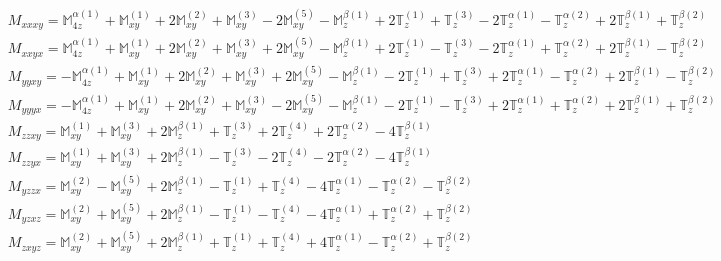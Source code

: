 \documentclass[fleqn,8pt,landscape]{jsarticle}
\begin{document}
\begin{align*}
& M_{xxxy} = \mathbb{M}_{4z}^{\alpha(1)} + \mathbb{M}_{xy}^{(1)} + 2 \mathbb{M}_{xy}^{(2)} + \mathbb{M}_{xy}^{(3)} - 2 \mathbb{M}_{xy}^{(5)} - \mathbb{M}_{z}^{\beta(1)} + 2 \mathbb{T}_{z}^{(1)} + \mathbb{T}_{z}^{(3)} - 2 \mathbb{T}_{z}^{\alpha(1)} - \mathbb{T}_{z}^{\alpha(2)} + 2 \mathbb{T}_{z}^{\beta(1)} + \mathbb{T}_{z}^{\beta(2)} \\
& M_{xxyx} = \mathbb{M}_{4z}^{\alpha(1)} + \mathbb{M}_{xy}^{(1)} + 2 \mathbb{M}_{xy}^{(2)} + \mathbb{M}_{xy}^{(3)} + 2 \mathbb{M}_{xy}^{(5)} - \mathbb{M}_{z}^{\beta(1)} + 2 \mathbb{T}_{z}^{(1)} - \mathbb{T}_{z}^{(3)} - 2 \mathbb{T}_{z}^{\alpha(1)} + \mathbb{T}_{z}^{\alpha(2)} + 2 \mathbb{T}_{z}^{\beta(1)} - \mathbb{T}_{z}^{\beta(2)} \\
& M_{yyxy} = - \mathbb{M}_{4z}^{\alpha(1)} + \mathbb{M}_{xy}^{(1)} + 2 \mathbb{M}_{xy}^{(2)} + \mathbb{M}_{xy}^{(3)} + 2 \mathbb{M}_{xy}^{(5)} - \mathbb{M}_{z}^{\beta(1)} - 2 \mathbb{T}_{z}^{(1)} + \mathbb{T}_{z}^{(3)} + 2 \mathbb{T}_{z}^{\alpha(1)} - \mathbb{T}_{z}^{\alpha(2)} + 2 \mathbb{T}_{z}^{\beta(1)} - \mathbb{T}_{z}^{\beta(2)} \\
& M_{yyyx} = - \mathbb{M}_{4z}^{\alpha(1)} + \mathbb{M}_{xy}^{(1)} + 2 \mathbb{M}_{xy}^{(2)} + \mathbb{M}_{xy}^{(3)} - 2 \mathbb{M}_{xy}^{(5)} - \mathbb{M}_{z}^{\beta(1)} - 2 \mathbb{T}_{z}^{(1)} - \mathbb{T}_{z}^{(3)} + 2 \mathbb{T}_{z}^{\alpha(1)} + \mathbb{T}_{z}^{\alpha(2)} + 2 \mathbb{T}_{z}^{\beta(1)} + \mathbb{T}_{z}^{\beta(2)} \\
& M_{zzxy} = \mathbb{M}_{xy}^{(1)} + \mathbb{M}_{xy}^{(3)} + 2 \mathbb{M}_{z}^{\beta(1)} + \mathbb{T}_{z}^{(3)} + 2 \mathbb{T}_{z}^{(4)} + 2 \mathbb{T}_{z}^{\alpha(2)} - 4 \mathbb{T}_{z}^{\beta(1)} \\
& M_{zzyx} = \mathbb{M}_{xy}^{(1)} + \mathbb{M}_{xy}^{(3)} + 2 \mathbb{M}_{z}^{\beta(1)} - \mathbb{T}_{z}^{(3)} - 2 \mathbb{T}_{z}^{(4)} - 2 \mathbb{T}_{z}^{\alpha(2)} - 4 \mathbb{T}_{z}^{\beta(1)} \\
& M_{yzzx} = \mathbb{M}_{xy}^{(2)} - \mathbb{M}_{xy}^{(5)} + 2 \mathbb{M}_{z}^{\beta(1)} - \mathbb{T}_{z}^{(1)} + \mathbb{T}_{z}^{(4)} - 4 \mathbb{T}_{z}^{\alpha(1)} - \mathbb{T}_{z}^{\alpha(2)} - \mathbb{T}_{z}^{\beta(2)} \\
& M_{yzxz} = \mathbb{M}_{xy}^{(2)} + \mathbb{M}_{xy}^{(5)} + 2 \mathbb{M}_{z}^{\beta(1)} - \mathbb{T}_{z}^{(1)} - \mathbb{T}_{z}^{(4)} - 4 \mathbb{T}_{z}^{\alpha(1)} + \mathbb{T}_{z}^{\alpha(2)} + \mathbb{T}_{z}^{\beta(2)} \\
& M_{zxyz} = \mathbb{M}_{xy}^{(2)} + \mathbb{M}_{xy}^{(5)} + 2 \mathbb{M}_{z}^{\beta(1)} + \mathbb{T}_{z}^{(1)} + \mathbb{T}_{z}^{(4)} + 4 \mathbb{T}_{z}^{\alpha(1)} - \mathbb{T}_{z}^{\alpha(2)} + \mathbb{T}_{z}^{\beta(2)} \\

\end{align*}
\end{document}
